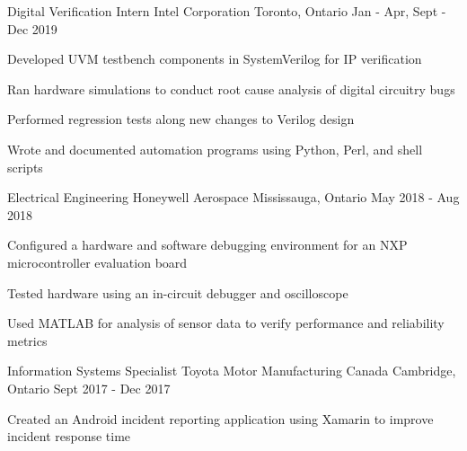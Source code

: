 

\begin{cventries}

  \cventry
    {Digital Verification Intern} %
    {Intel Corporation} %
    {Toronto, Ontario} %
    {Jan - Apr, Sept - Dec 2019} %
    {
      \begin{cvitems} %
        \item {Developed UVM testbench components in SystemVerilog for IP verification}
        \item {Ran hardware simulations to conduct root cause analysis of digital circuitry bugs}
        \item {Performed regression tests along new changes to Verilog design}
        \item {Wrote and documented automation programs using Python, Perl, and shell scripts}
      \end{cvitems}
    }

  \cventry
    {Electrical Engineering} %
    {Honeywell Aerospace} %
    {Mississauga, Ontario} %
    {May 2018 - Aug 2018} %
    {
      \begin{cvitems} %
        \item {Configured a hardware and software debugging environment for an NXP microcontroller evaluation board}
        \item {Tested hardware using an in-circuit debugger and oscilloscope}
        \item {Used MATLAB for analysis of sensor data to verify performance and reliability metrics}
      \end{cvitems}
    }

  \cventry
    {Information Systems Specialist} %
    {Toyota Motor Manufacturing Canada} %
    {Cambridge, Ontario} %
    {Sept 2017 - Dec 2017} %
    {
      \begin{cvitems} %
        \item {Created an Android incident reporting application using Xamarin to improve incident response time}
      \end{cvitems}
    }


\end{cventries}
